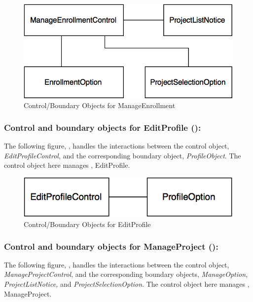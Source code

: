 \documentclass[12pt,letterpaper]{article}
\begin{document}
\vspace{1em}

\begin{figure}[H]
	\centering{}
	\includegraphics[scale=0.37]{imgs/cbod/manage-enrollment.png}
	\caption{Control/Boundary Objects for ManageEnrollment}
\end{figure}

\subsubsection*{Control and boundary objects for EditProfile ():}

The following figure, , handles the interactions between the control object, {\it EditProfileControl}, and the corresponding
boundary object, {\it ProfileObject}. The control object here manages , EditProfile.

\vspace{1em}

\begin{figure}[H]
	\centering{}
	\includegraphics[scale=0.37]{imgs/cbod/edit-profile.png}
	\caption{Control/Boundary Objects for EditProfile}
\end{figure}

\subsubsection*{Control and boundary objects for ManageProject ():}

The following figure, , handles the interactions between the control object, {\it ManageProjectControl}, and the corresponding boundary objects, {\it ManageOption, ProjectListNotice,} and {\it ProjectSelectionOption}. The control object here manages , ManageProject.
\end{document}
